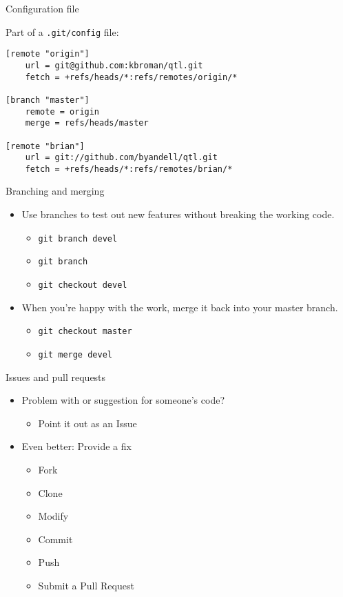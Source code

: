 \documentclass[12pt,t]{beamer}
\newcommand{\bi}{\begin{itemize}}
\newcommand{\bbi}{\vspace{24pt} \begin{itemize} \itemsep8pt}
\newcommand{\ei}{\end{itemize}}
\begin{document}
\begin{frame}[fragile]{Configuration file}

\vspace{24pt}

Part of a {\tt .git/config} file:

\begin{lstlisting}
[remote "origin"]
	url = git@github.com:kbroman/qtl.git
	fetch = +refs/heads/*:refs/remotes/origin/*

[branch "master"]
	remote = origin
	merge = refs/heads/master

[remote "brian"]
	url = git://github.com/byandell/qtl.git
	fetch = +refs/heads/*:refs/remotes/brian/*
\end{lstlisting}

\end{frame}


\begin{frame}{Branching and merging}

\bbi
\item Use branches to test out new features without breaking the
  working code.
\bi
\item[] {\tt git branch devel}
\item[] {\tt git branch}
\item[] {\tt git checkout devel}
\ei
\item When you're happy with the work, merge it back into your master
  branch.
\bi
\item[] {\tt git checkout master}
\item[] {\tt git merge devel}
\ei
\ei
{}
\end{frame}

\begin{frame}{Issues and pull requests}
\bbi
\item Problem with or suggestion for someone's code?
\bi
\item Point it out as an Issue
\ei
\item Even better: Provide a fix
\bi
\item Fork
\item Clone
\item Modify
\item Commit
\item Push
\item Submit a Pull Request
\ei
\ei

\end{frame}
\end{document}
